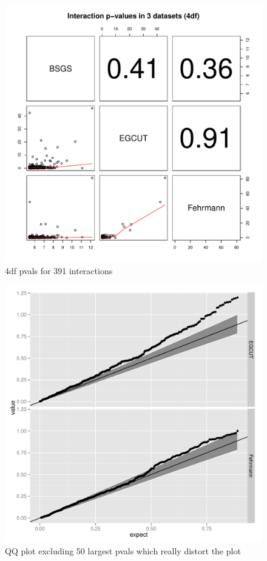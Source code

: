 \documentclass[paper=a4, fontsize=11pt]{scrartcl}	%
\numberwithin{equation}{section}									%
\numberwithin{figure}{section}										%
\numberwithin{table}{section}										%
\begin{document}
\begin{figure}[p]
	\centering
	\includegraphics[width=15cm]{images/pnest_rep_pvals}
	\caption{4df pvals for 391 interactions}
	\label{fig:cor_4df}
\end{figure}

\begin{figure}[p]
	\centering
	\includegraphics[width=15cm]{images/qqplot_replication}
	\caption{QQ plot excluding 50 largest pvals which really distort the plot}
	\label{fig:cor_8df}
\end{figure}
\end{document}
